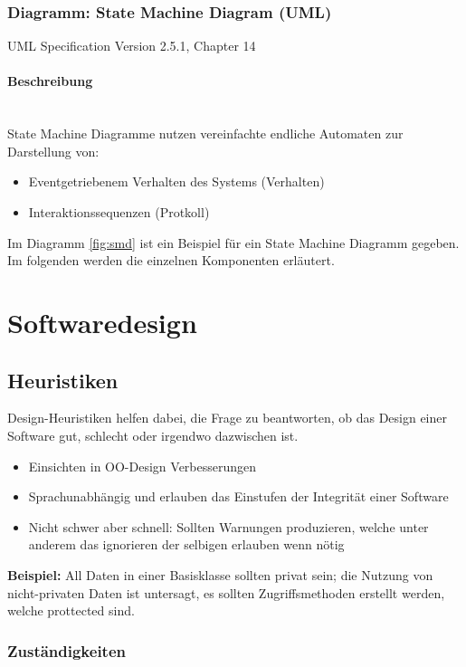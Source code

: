 \documentclass[ngerman]{tuda_summary}
\begin{document}
\subsubsection{Diagramm: State Machine Diagram (UML)}
\label{diagram:statemachine}

{ \footnotesize UML Specification Version 2.5.1, Chapter 14}

\paragraph{Beschreibung}\mbox{}\\
State Machine Diagramme nutzen vereinfachte endliche Automaten zur Darstellung von:
\begin{itemize}
    \item Eventgetriebenem Verhalten des Systems (Verhalten)
    \item Interaktionssequenzen (Protkoll)
\end{itemize}

Im Diagramm \ref{fig:smd} ist ein Beispiel für ein State Machine Diagramm gegeben. Im folgenden werden die einzelnen Komponenten erläutert.

\clearpage
\section{Softwaredesign}
\subsection{Heuristiken}
Design-Heuristiken helfen dabei, die Frage zu beantworten, ob das Design einer Software gut, schlecht oder irgendwo dazwischen ist.
\begin{itemize}
    \item Einsichten in OO-Design Verbesserungen
    \item Sprachunabhängig und erlauben das Einstufen der Integrität einer Software
    \item Nicht schwer aber schnell: Sollten Warnungen produzieren, welche unter anderem das ignorieren der selbigen erlauben wenn nötig
\end{itemize}

\textbf{Beispiel:} All Daten in einer Basisklasse sollten privat sein; die Nutzung von nicht-privaten Daten ist untersagt, es sollten Zugriffsmethoden erstellt werden, welche prottected sind.

\subsubsection{Zuständigkeiten}
\end{document}
